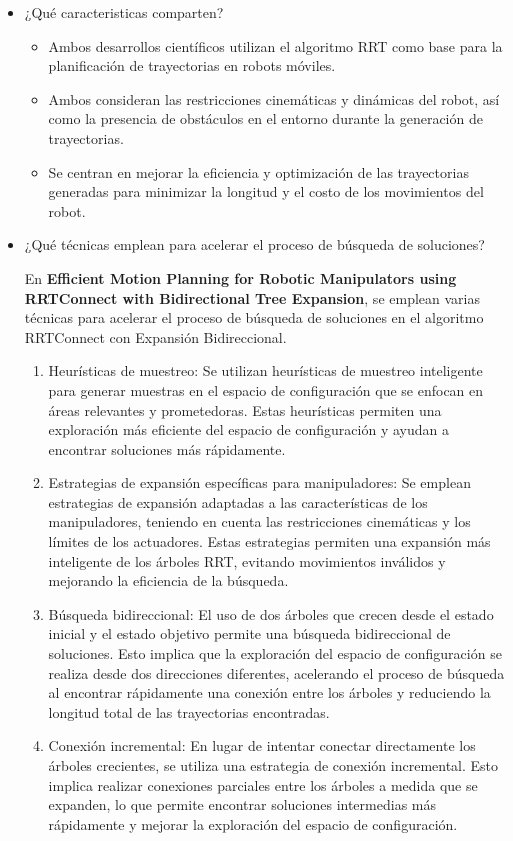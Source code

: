 \documentclass{article}
\begin{document}
\begin{itemize}
\item{¿Qué caracteristicas comparten?}

  \begin{itemize}
  \item Ambos desarrollos científicos utilizan el algoritmo RRT como base para la planificación de trayectorias en robots móviles.
  \item Ambos consideran las restricciones cinemáticas y dinámicas del robot, así como la presencia de obstáculos en el entorno durante la generación de trayectorias.
  \item Se centran en mejorar la eficiencia y optimización de las trayectorias generadas para minimizar la longitud y el costo de los movimientos del robot.
  \end{itemize}
  
\item{¿Qué técnicas emplean para acelerar el proceso de búsqueda de soluciones?}

  En \textbf{Efficient Motion Planning for Robotic Manipulators using RRTConnect with Bidirectional Tree Expansion}, se emplean varias técnicas para acelerar el proceso de búsqueda de soluciones en el algoritmo RRTConnect con Expansión Bidireccional.

  \begin{enumerate}
  \item Heurísticas de muestreo: Se utilizan heurísticas de muestreo inteligente para generar muestras en el espacio de configuración que se enfocan en áreas relevantes y prometedoras. Estas heurísticas permiten una exploración más eficiente del espacio de configuración y ayudan a encontrar soluciones más rápidamente.
  \item Estrategias de expansión específicas para manipuladores: Se emplean estrategias de expansión adaptadas a las características de los manipuladores, teniendo en cuenta las restricciones cinemáticas y los límites de los actuadores. Estas estrategias permiten una expansión más inteligente de los árboles RRT, evitando movimientos inválidos y mejorando la eficiencia de la búsqueda.
  \item Búsqueda bidireccional: El uso de dos árboles que crecen desde el estado inicial y el estado objetivo permite una búsqueda bidireccional de soluciones. Esto implica que la exploración del espacio de configuración se realiza desde dos direcciones diferentes, acelerando el proceso de búsqueda al encontrar rápidamente una conexión entre los árboles y reduciendo la longitud total de las trayectorias encontradas.
  \item Conexión incremental: En lugar de intentar conectar directamente los árboles crecientes, se utiliza una estrategia de conexión incremental. Esto implica realizar conexiones parciales entre los árboles a medida que se expanden, lo que permite encontrar soluciones intermedias más rápidamente y mejorar la exploración del espacio de configuración.
  \end{enumerate}


\end{itemize}
\end{document}
